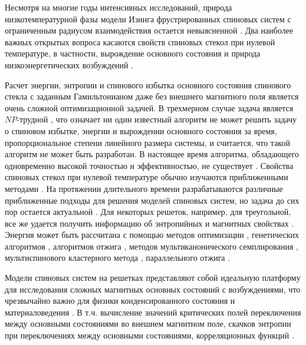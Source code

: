 \documentclass[utf8, babel, sor, jor, amsmath, amssymb, reprint]{elsarticle} %
\begin{document}
Несмотря на многие годы интенсивных исследований, природа низкотемпературной фазы модели Изинга фрустрированных спиновых систем с ограниченным радиусом взаимодействия остается невыясненной \cite{roma2010ground, newman2023proof}. Два наиболее важных открытых вопроса касаются свойств спиновых стекол при нулевой температуре, в частности, вырождение основного состояния и природа низкоэнергетических возбуждений \cite{newman2022ground}.  

Расчет энергии, энтропии и спинового избытка основного состояния спинового стекла с заданным Гамильтонианом даже без внешнего магнитного поля является очень сложной оптимизационной задачей. В трехмерном случае задача является $NP$-трудной \cite{barahona1982computational, hartmann2002optimization}, что означает ни один известный алгоритм не может решить задачу о спиновом избытке, энергии и вырождении основного состояния за время, пропорциональное степени линейного размера системы, и считается, что такой алгоритм не может быть разработан. В настоящее время алгоритма, обладающего одновременно высокой точностью и эффективностью, не существует \cite{fan2023searching}. Свойства спиновых стекол при нулевой температуре обычно изучаются приближенными методами \cite{roma2009ground, perez2012ground}. На протяжении длительного времени разрабатываются различные приближенные подходы для решения моделей спиновых систем, но задача до сих пор остается актуальной \cite{ rybin2022hybrid, makarova2023canonical,farias2024differentiable}.  Для некоторых решеток, например, для треугольной, все же удается получить информацию об энтропийных и магнитных свойствах \cite{jurvcivsinova2024classical}. Энергия может быть рассчитана с помощью методов оптимизации \cite{hartmann2002optimization, hartmann2004new}, генетических алгоритмов \cite{holland1992adaptation}, алгоритмов отжига \cite{kirkpatrick1983optimization}, методов мультиканонического семплирования \cite{berg1994ground, shevchenko2017multicanonical}, мультиспинового кластерного метода \cite{makarova2023canonical}, параллельного отжига \cite{PhysRevB.50.16444, roma2009ground}. 

Модели спиновых систем на решетках представляют собой идеальную платформу для исследования сложных магнитных основных состояний с возбуждениями, что чрезвычайно важно для физики конденсированного состояния и материаловедения \cite{lacroix2011introduction}. В т.ч. вычисление значений критических полей переключения между основными состояниями во внешнем магнитном поле, скачков энтропии при переключениях между основными состояниями, корреляционных функций \cite{ramirez2004effect, rosas2004random, andriushchenko2019large}. 
\end{document}
